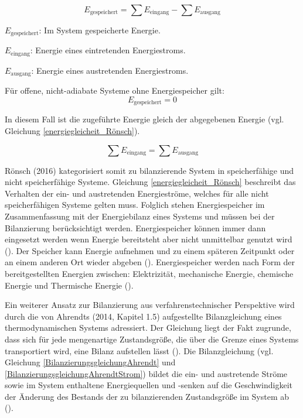 \begin{equation}
E_{\text{gespeichert}} = \sum E_{\text{eingang}} - \sum E_{\text{ausgang}}
\label{energiebilanzierungsgleichung_Rönsch}
\end{equation}

\begin{description}
    \item \(E_{\text{gespeichert}}\): Im System gespeicherte Energie.
    \item \(E_{\text{eingang}}\): Energie eines eintretenden Energiestroms.
    \item \(E_{\text{ausgang}}\): Energie eines austretenden Energiestroms.
    \item Für offene, nicht-adiabate Systeme ohne Energiespeicher gilt:
    \[
    E_{\text{gespeichert}} = 0
    \]
    \item In diesem Fall ist die zugeführte Energie gleich der abgegebenen Energie (vgl. Gleichung \eqref{energiegleicheit_Rönsch}).
\end{description}

\begin{equation}
    \sum E_{\text{eingang}} = \sum E_{\text{ausgang}}
    \label{energiegleicheit_Rönsch}
\end{equation}

Rönsch (2016) kategorisiert somit zu bilanzierende System in speicherfähige und nicht speicherfähige Systeme.
Gleichung \eqref{energiegleicheit_Rönsch} beschreibt das Verhalten der ein- und austretenden Energieströme, welches für alle 
nicht speicherfähigen Systeme gelten muss.
Folglich stehen Energiespeicher im Zusammenfassung mit der Energiebilanz eines Systems und müssen bei der Bilanzierung berücksichtigt werden.
Energiespeicher können immer dann eingesetzt werden wenn Energie bereitsteht aber nicht unmittelbar genutzt wird (\cite[S. 1]{Rathgeber.2018}).
Der Speicher kann Energie aufnehmen und zu einem späteren Zeitpunkt oder an einem anderen Ort wieder abgeben (\cite[S. 1]{Rathgeber.2018}).
Energiespeicher werden nach Form der bereitgestellten Energien zwischen: Elektrizität, mechanische Energie, chemische Energie und Thermische 
Energie (\cite[S. 1]{Rathgeber.2018}).


Ein weiterer Ansatz zur Bilanzierung aus verfahrenstechnischer Perspektive wird durch die von Ahrendts (2014, Kapitel 1.5) aufgestellte Bilanzgleichung eines 
thermodynamischen Systems adressiert.
Der Gleichung liegt der Fakt zugrunde, dass sich für jede mengenartige Zustandsgröße, die über die Grenze eines Systems transportiert wird, eine Bilanz aufstellen lässt 
(\cite[Kapitel 1.5]{Ahrendts.2014}).
Die Bilanzgleichung (vgl. Gleichung \eqref{BilanzierungsgleichungAhrendt} und \eqref{BilanzierungsgleichungAhrendtStrom}) 
bildet die ein- und austretende Ströme sowie im System enthaltene Energiequellen und -senken auf die Geschwindigkeit der Änderung des Bestands der 
zu bilanzierenden Zustandsgröße im System ab (\cite[Kapitel 1.5]{Ahrendts.2014}).

